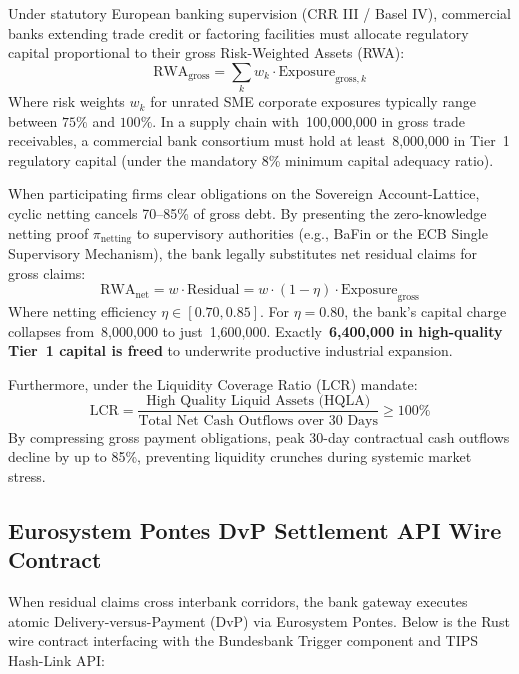 \documentclass[a4paper,11pt,twoside,parskip=half-,headings=small]{scrartcl}
\newcommand{\EUR}[1]{\texteuro\,#1}
\begin{document}
Under statutory European banking supervision (CRR III / Basel IV), commercial banks
extending trade credit or factoring facilities must allocate regulatory capital
proportional to their gross Risk-Weighted Assets (RWA):
\begin{equation}
\text{RWA}_{\text{gross}} = \sum_{k} w_k \cdot \text{Exposure}_{\text{gross}, k}
\end{equation}
Where risk weights $w_k$ for unrated SME corporate exposures typically range between
$75\%$ and $100\%$. In a supply chain with \EUR{100,000,000} in gross trade receivables,
a commercial bank consortium must hold at least \EUR{8,000,000} in Tier~1 regulatory capital
(under the mandatory 8\% minimum capital adequacy ratio).

When participating firms clear obligations on the Sovereign Account-Lattice,
cyclic netting cancels 70--85\% of gross debt. By presenting the zero-knowledge netting
proof $\pi_{\text{netting}}$ to supervisory authorities (e.g., BaFin or the ECB Single
Supervisory Mechanism), the bank legally substitutes net residual claims for gross claims:
\begin{equation}
\text{RWA}_{\text{net}} = w \cdot \text{Residual} = w \cdot (1 - \eta) \cdot \text{Exposure}_{\text{gross}}
\end{equation}
Where netting efficiency $\eta \in [0.70, 0.85]$. For $\eta = 0.80$, the bank's capital
charge collapses from \EUR{8,000,000} to just \EUR{1,600,000}. Exactly \textbf{\EUR{6,400,000}
in high-quality Tier~1 capital is freed} to underwrite productive industrial expansion.

Furthermore, under the Liquidity Coverage Ratio (LCR) mandate:
\begin{equation}
\text{LCR} = \frac{\text{High Quality Liquid Assets (HQLA)}}{\text{Total Net Cash Outflows over 30 Days}} \ge 100\%
\end{equation}
By compressing gross payment obligations, peak 30-day contractual cash outflows decline
by up to 85\%, preventing liquidity crunches during systemic market stress.

\subsection{Eurosystem Pontes DvP Settlement API Wire Contract}
\label{sec:pontes_wire_contract}

When residual claims cross interbank corridors, the bank gateway executes atomic
Delivery-versus-Payment (DvP) via Eurosystem Pontes. Below is the Rust wire contract
interfacing with the Bundesbank Trigger component and TIPS Hash-Link API:
\end{document}

